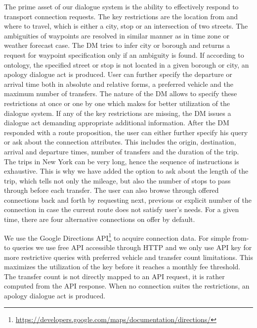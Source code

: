 The prime asset of our dialogue system is the ability to effectively respond to transport connection requests.
The key restrictions are the location from and where to travel, which is either a city, stop or an intersection of two streets.
The ambiguities of waypoints are resolved in similar manner as in time zone or weather forecast case.
The DM tries to infer city or borough and returns a request for waypoint specification only if an ambiguity is found.
If according to ontology, the specified street or stop is not located in a given borough or city, an apology dialogue act is produced.
User can further specify the departure or arrival time both in absolute and relative forms, a preferred vehicle and the maximum number of transfers.
The nature of the DM allows to specify these restrictions at once or one by one which makes for better utilization of the dialogue system.
If any of the key restrictions are missing, the DM issues a dialogue act demanding appropriate additional information.
After the DM responded with a route proposition, the user can either further specify his query or ask about the connection attributes.
This includes the origin, destination, arrival and departure times, number of transfers and the duration of the trip.
The trips in New York can be very long, hence the sequence of instructions is exhaustive.
This is why we have added the option to ask about the length of the trip, which tells not only the mileage, but also the number of stops to pass through before each transfer.
The user can also browse through offered connections back and forth by requesting next, previous or explicit number of the connection in case the current route does not satisfy user's needs.
For a given time, there are four alternative connections on offer by default.

We use the Google Directions API\footnote{\url{https://developers.google.com/maps/documentation/directions/}} to acquire connection data.
For simple from-to queries we use free API accessible through HTTP and we only use API key for more restrictive queries with preferred vehicle and transfer count limitations.
This maximizes the utilization of the key before it reaches a monthly fee threshold.
The transfer count is not directly mapped to an API request, it is rather computed from the API response.
When no connection suites the restrictions, an apology dialogue act is produced.







